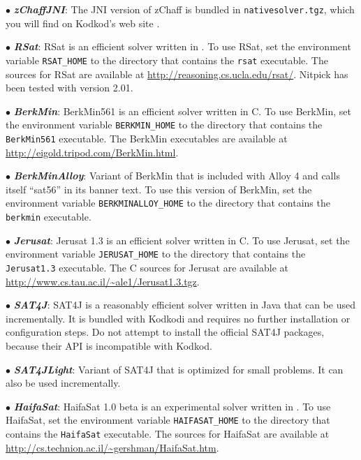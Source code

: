 \documentclass[a4paper,12pt]{article}
\begin{document}
\begin{enum}
\begin{enum}
\item[$\bullet$] \textbf{\textit{zChaffJNI}}: The JNI version of zChaff is
bundled in \texttt{native\-solver.\allowbreak tgz}, which you will find on
Kodkod's web site \cite{kodkod-2009}.

\item[$\bullet$] \textbf{\textit{RSat}}: RSat is an efficient solver written in
\cpp{}. To use RSat, set the environment variable \texttt{RSAT\_HOME} to the
directory that contains the \texttt{rsat} executable. The \cpp{} sources for
RSat are available at \url{http://reasoning.cs.ucla.edu/rsat/}. Nitpick has been
tested with version 2.01.

\item[$\bullet$] \textbf{\textit{BerkMin}}: BerkMin561 is an efficient solver
written in C. To use BerkMin, set the environment variable
\texttt{BERKMIN\_HOME} to the directory that contains the \texttt{BerkMin561}
executable. The BerkMin executables are available at
\url{http://eigold.tripod.com/BerkMin.html}.

\item[$\bullet$] \textbf{\textit{BerkMinAlloy}}: Variant of BerkMin that is
included with Alloy 4 and calls itself ``sat56'' in its banner text. To use this
version of BerkMin, set the environment variable
\texttt{BERKMINALLOY\_HOME} to the directory that contains the \texttt{berkmin}
executable.

\item[$\bullet$] \textbf{\textit{Jerusat}}: Jerusat 1.3 is an efficient solver
written in C. To use Jerusat, set the environment variable
\texttt{JERUSAT\_HOME} to the directory that contains the \texttt{Jerusat1.3}
executable. The C sources for Jerusat are available at
\url{http://www.cs.tau.ac.il/~ale1/Jerusat1.3.tgz}.

\item[$\bullet$] \textbf{\textit{SAT4J}}: SAT4J is a reasonably efficient solver
written in Java that can be used incrementally. It is bundled with Kodkodi and
requires no further installation or configuration steps. Do not attempt to
install the official SAT4J packages, because their API is incompatible with
Kodkod.

\item[$\bullet$] \textbf{\textit{SAT4JLight}}: Variant of SAT4J that is
optimized for small problems. It can also be used incrementally.

\item[$\bullet$] \textbf{\textit{HaifaSat}}: HaifaSat 1.0 beta is an
experimental solver written in \cpp. To use HaifaSat, set the environment
variable \texttt{HAIFASAT\_\allowbreak HOME} to the directory that contains the
\texttt{HaifaSat} executable. The \cpp{} sources for HaifaSat are available at
\url{http://cs.technion.ac.il/~gershman/HaifaSat.htm}.


\end{enum}
\end{enum}
\end{document}
